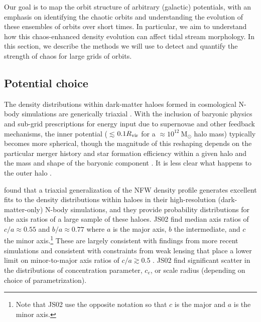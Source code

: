 \documentclass[letterpaper,12pt,preprint]{aastex}
\newcommand{\msun}{\ensuremath{\mathrm{M}_\odot}}
\begin{document}
Our goal is to map the orbit structure of arbitrary (galactic) potentials, with an emphasis on identifying the chaotic orbits and understanding the evolution of these ensembles of orbits over short times. In particular, we aim to understand how this chaos-enhanced density evolution can affect tidal stream morphology. In this section, we describe the methods we will use to detect and quantify the strength of chaos for large grids of orbits.

\subsection{Potential choice}\label{sec:potential}

The density distributions within dark-matter haloes formed in cosmological N-body simulations are generically triaxial \citep[e.g.,][]{jing02, bett07, zemp09, veraciro11}. With the inclusion of baryonic physics and sub-grid prescriptions for energy input due to supernovae and other feedback mechanisms, the inner potential ($\lesssim$$0.1R_{\rm vir}$ for a $\approx$$10^{12}~\msun$ halo mass) typically becomes more spherical, though the magnitude of this reshaping depends on the particular merger history and star formation efficiency within a given halo and the mass and shape of the baryonic component \citep[e.g.,][though in Milky Way-like galaxies, baryonic disks will add non-sphericity to the total potential]{dubinski94,kazantzidis04, debattista08, bryan13, butsky15}. It is less clear what happens to the outer halo \citep[e.g.,][]{zemp11, valluri13}.

 \citet[][hereafter JS02]{jing02} found that a triaxial generalization of the NFW density profile \citep{navarro96} generates excellent fits to the density distributions within haloes in their high-resolution (dark-matter-only) N-body simulations, and they provide probability distributions for the axis ratios of a large sample of these haloes. JS02 find median axis ratios of $c/a \approx 0.55$ and $b/a \approx 0.77$ where $a$ is the major axis, $b$ the intermediate, and $c$ the minor axis.\footnote{Note that JS02 use the opposite notation so that $c$ is the major and $a$ is the minor axis.} These are largely consistent with findings from more recent simulations \citep[e.g.,][]{bett07, veraciro11, butsky15, zhu15} and consistent with constraints from weak lensing that place a lower limit on minor-to-major axis ratios of $c/a\gtrsim0.5$ \citep{vanuitert12}. JS02 find significant scatter in the distributions of concentration parameter, $c_e$, or scale radius (depending on choice of parametrization). 
\end{document}
